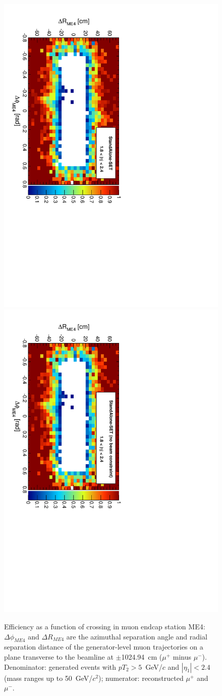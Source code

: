 \documentclass[12pt]{article}
\begin{document}
\begin{figure}[p]
\includegraphics[height=0.5\linewidth, angle=90]{fig/acceptance7_plot/me4_StandAloneUpdatedSET.pdf}
\includegraphics[height=0.5\linewidth, angle=90]{fig/acceptance7_plot/me4_StandAloneSET.pdf}

\caption{Efficiency as a function of crossing in muon endcap station
  ME4: $\Delta\phi_{ME4}$ and $\Delta R_{ME4}$ are the azimuthal
  separation angle and radial separation distance of the
  generator-level muon trajectories on a plane transverse to the
  beamline at $\pm$1024.94~cm ($\mu^+$ minus $\mu^-$).  Denominator:
  generated events with $pT_2 > 5$~GeV/$c$ and $|\eta_1| < 2.4$ (mass
  ranges up to 50~GeV/$c^2$); numerator: reconstructed $\mu^+$ and
  $\mu^-$. \label{fig:me4}}
\end{figure}
\end{document}
